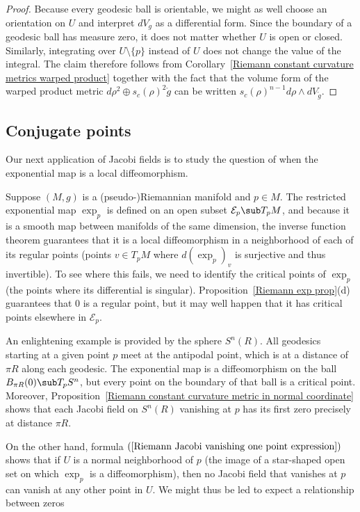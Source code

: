 \begin{proof}
Because every geodesic ball is orientable, we might as well choose an orientation on $U$ and interpret $dV_g$ as a differential form. Since the boundary of a geodesic 
ball has measure zero, it does not matter whether $U$ is open or closed. Similarly, integrating over $U\setminus\{p\}$ instead of $U$ does not change the value of the 
integral. The claim therefore follows from Corollary~\ref{Riemann constant curvature metrics warped product} together with the fact that the volume form of the warped 
product metric $d\rho^2\oplus s_c(\rho)^2\mathring{g}$ can be written $s_c(\rho)^{n-1}d\rho\wedge dV_{\mathring{g}}$.
\end{proof}
\subsection{Conjugate points}
Our next application of Jacobi fields is to study the question of when the exponential map is a local diffeomorphism.\par
Suppose $(M,g)$ is a (pseudo-)Riemannian manifold and $p\in M$. The restricted exponential map $\exp_p$ is defined on an open subset $\mathcal{E}_p\sub T_pM$, 
and because it is a smooth map between manifolds of the same dimension, the inverse function theorem guarantees that it is a local diffeomorphism in a neighborhood of 
each of its regular points (points $v\in T_pM$ where $d(\exp_p)_v$ is surjective and thus invertible). To see where this fails, we need to identify the critical points 
of $\exp_p$ (the points where its differential is singular). Proposition~\ref{Riemann exp prop}(d) guarantees that $0$ is a regular point, but it may well happen that 
it has critical points elsewhere in $\mathcal{E}_p$.\par
An enlightening example is provided by the sphere $S^n(R)$. All geodesics starting at a given point $p$ meet at the antipodal point, which is at a distance of $\pi R$ 
along each geodesic. The exponential map is a diffeomorphism on the ball $B_{\pi R}(0)\sub T_pS^n$, but every point on the boundary of that ball is a critical point. 
Moreover, Proposition~\ref{Riemann constant curvature metric in normal coordinate} shows that each Jacobi field on $S^n(R)$ vanishing at $p$ has its first zero precisely 
at distance $\pi R$.\par
On the other hand, formula $(\ref{Riemann Jacobi vanishing one point expression})$ shows that if $U$ is a normal neighborhood of $p$ (the image of a star-shaped open set on which 
$\exp_p$ is a diffeomorphism), then no Jacobi field that vanishes at $p$ can vanish at any other point in $U$. We might thus be led to expect a relationship between zeros 

